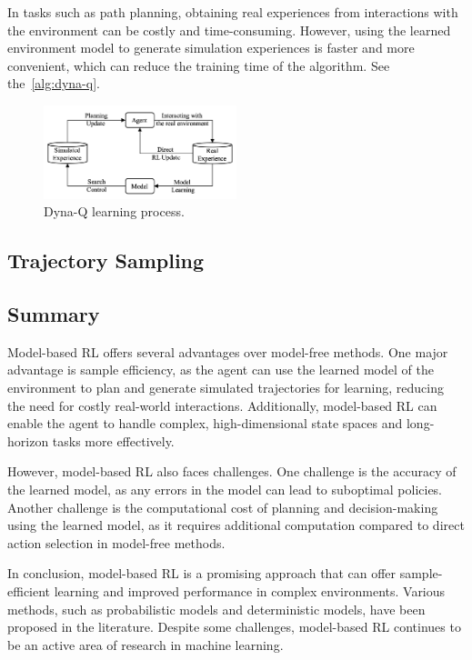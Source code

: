 \documentclass[../xlapes02]{subfiles}
\begin{document}
    In tasks such as path planning, obtaining real experiences from interactions with the environment can be costly and time-consuming. However, using the learned environment model to generate simulation experiences is faster and more convenient, which can reduce the training time of the algorithm. See the~\cref{alg:dyna-q}.

    \begin{figure}
        \centering
        \includegraphics[width=0.5\textwidth]{image/dyna-q-learning}
        \caption{Dyna-Q learning process.}
        \label{fig:dyna-q-learning}
    \end{figure}

    \subsection{Trajectory Sampling}\label{subsec:trajectory-sampling}

    \subsection{Summary}\label{subsec:summary}

    Model-based RL offers several advantages over model-free methods. One major advantage is sample efficiency, as the agent can use the learned model of the environment to plan and generate simulated trajectories for learning, reducing the need for costly real-world interactions. Additionally, model-based RL can enable the agent to handle complex, high-dimensional state spaces and long-horizon tasks more effectively.

    However, model-based RL also faces challenges. One challenge is the accuracy of the learned model, as any errors in the model can lead to suboptimal policies. Another challenge is the computational cost of planning and decision-making using the learned model, as it requires additional computation compared to direct action selection in model-free methods.

    In conclusion, model-based RL is a promising approach that can offer sample-efficient learning and improved performance in complex environments. Various methods, such as probabilistic models and deterministic models, have been proposed in the literature. Despite some challenges, model-based RL continues to be an active area of research in machine learning.
\end{document}
